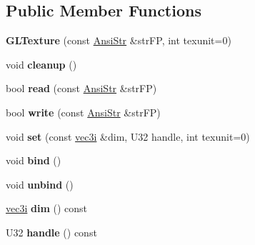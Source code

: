 \subsection*{Public Member Functions}
\begin{DoxyCompactItemize}
\item 
\hypertarget{classps_1_1opengl_1_1GLTexture_ae99378a645c82f379dcb22e6dd4fcafc}{}{\bfseries G\+L\+Texture} (const \hyperlink{classps_1_1base_1_1CAString}{Ansi\+Str} \&str\+F\+P, int texunit=0)\label{classps_1_1opengl_1_1GLTexture_ae99378a645c82f379dcb22e6dd4fcafc}

\item 
\hypertarget{classps_1_1opengl_1_1GLTexture_ac022d03096e4237655c343498bb42e7a}{}void {\bfseries cleanup} ()\label{classps_1_1opengl_1_1GLTexture_ac022d03096e4237655c343498bb42e7a}

\item 
\hypertarget{classps_1_1opengl_1_1GLTexture_ac4e7ca9c8f54f4d164ab4961b6792bdb}{}bool {\bfseries read} (const \hyperlink{classps_1_1base_1_1CAString}{Ansi\+Str} \&str\+F\+P)\label{classps_1_1opengl_1_1GLTexture_ac4e7ca9c8f54f4d164ab4961b6792bdb}

\item 
\hypertarget{classps_1_1opengl_1_1GLTexture_affe70af1b538192d985bb62a403ca847}{}bool {\bfseries write} (const \hyperlink{classps_1_1base_1_1CAString}{Ansi\+Str} \&str\+F\+P)\label{classps_1_1opengl_1_1GLTexture_affe70af1b538192d985bb62a403ca847}

\item 
\hypertarget{classps_1_1opengl_1_1GLTexture_a94945c201c3714d1cf55dec4e529f75c}{}void {\bfseries set} (const \hyperlink{classps_1_1base_1_1Vec3}{vec3i} \&dim, U32 handle, int texunit=0)\label{classps_1_1opengl_1_1GLTexture_a94945c201c3714d1cf55dec4e529f75c}

\item 
\hypertarget{classps_1_1opengl_1_1GLTexture_a130c88e04751028a2de07e670462ea09}{}void {\bfseries bind} ()\label{classps_1_1opengl_1_1GLTexture_a130c88e04751028a2de07e670462ea09}

\item 
\hypertarget{classps_1_1opengl_1_1GLTexture_a8ae1327db35ec7d4a6948b174f3318d3}{}void {\bfseries unbind} ()\label{classps_1_1opengl_1_1GLTexture_a8ae1327db35ec7d4a6948b174f3318d3}

\item 
\hypertarget{classps_1_1opengl_1_1GLTexture_a211f23b09fa14e454908afe4c81c79c5}{}\hyperlink{classps_1_1base_1_1Vec3}{vec3i} {\bfseries dim} () const \label{classps_1_1opengl_1_1GLTexture_a211f23b09fa14e454908afe4c81c79c5}

\item 
\hypertarget{classps_1_1opengl_1_1GLTexture_a441699385e9443f1d6eb6ed9677fddbb}{}U32 {\bfseries handle} () const \label{classps_1_1opengl_1_1GLTexture_a441699385e9443f1d6eb6ed9677fddbb}

\end{DoxyCompactItemize}
